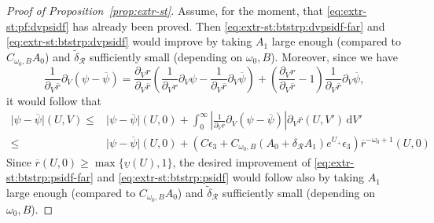 \documentclass[10pt, reqno]{amsart}
\theoremstyle{definition}
\theoremstyle{remark}
\theoremstyle{conjecture}
\numberwithin{equation}{section}
\newcommand{\abs}[1]{\vert#1\vert}
\newcommand{\set}[1]{\{#1\}}
\newcommand{\ud}{\mathrm{d}}
\newcommand{\rd}{\partial}
\newcommand{\0}{\emptyset}
\newcommand{\dlt}{\delta}
\newcommand{\eps}{\epsilon}
\newcommand{\omg}{\omega}
\newcommand{\ups}{\upsilon}
\newcommand{\calR}{\mathcal R}
\newcommand{\psibg}{\overline{\psi}}				%
\newcommand{\rbg}{\overline{r}}					%
\newcommand{\Abs}[1]{\left\vert #1 \right\vert}
\begin{document}
\begin{proof}[Proof of Proposition~\ref{prop:extr-st}]
Assume, for the moment, that \eqref{eq:extr-st:pf:dvpsidf} has already been proved. Then \eqref{eq:extr-st:btstrp:dvpsidf-far} and \eqref{eq:extr-st:btstrp:dvpsidf} would improve by taking $A_{1}$ large enough (compared to $C_{\omg_0, B} A_{0}$) and $\widetilde{\dlt}_{\calR}$ sufficiently small (depending on $\omg_0, B$). Moreover, since we have
\begin{equation*}
	\frac{1}{\rd_{V} \rbg} \rd_{V} (\psi - \psibg)
	= \frac{\rd_{V} r}{\rd_{V} \rbg} \left( \frac{1}{\rd_{V} r} \rd_{V} \psi - \frac{1}{\rd_{V} \rbg} \rd_{V} \psibg \right) + \left(\frac{\rd_{V} r}{\rd_{V} \rbg} - 1 \right)\frac{1}{\rd_{V} \rbg} \rd_{V} \psibg,
\end{equation*}
it would follow that
\begin{align*}
	\abs{\psi - \psibg}(U, V)
	\leq & \abs{\psi - \psibg}(U, 0) + \int_{0}^{\infty} \Abs{\frac{1}{\rd_{V} \rbg} \rd_{V} (\psi - \psibg)} \rd_{V} \rbg(U, V') \, \ud V' \\
	\leq & \abs{\psi - \psibg}(U, 0) + \left( C \eps_{3} + C_{\omg_0, B} (A_{0} + \dlt_{\calR} A_{1}) e^{U_{+}} \eps_{3} \right) \rbg^{-\omg_0+1}(U, 0)
\end{align*}
Since $\rbg(U, 0) \geq \max \set{\underline{\ups}(U), 1}$, the desired improvement of \eqref{eq:extr-st:btstrp:psidf-far} and \eqref{eq:extr-st:btstrp:psidf} would follow also by taking $A_{1}$ large enough (compared to $C_{\omg_0, B} A_{0}$) and $\widetilde{\dlt}_{\calR}$ sufficiently small (depending on $\omg_0, B$).


\end{proof}
\end{document}
